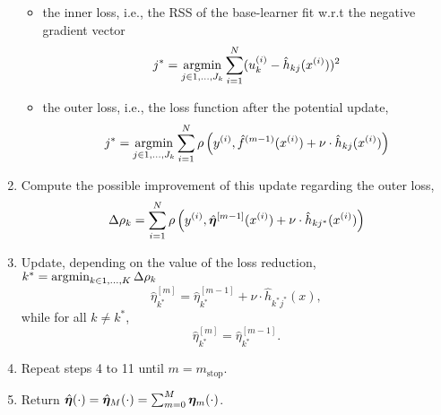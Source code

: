 \begin{algorithm}
\begin{enumerate}
        \begin{itemize}
            \item the inner loss, i.e., the RSS of the base-learner fit w.r.t the negative gradient vector
                \begin{equation*}
                    j^*=\operatorname*{argmin}_{j\in 1,\ldots,J_k}\sum_{i=1}^N(u_k^{(i)}-\hat{h}_{kj}(x^{(i)}))^2
                \end{equation*}
            \item the outer loss, i.e., the loss function after the potential update,
                \begin{equation*}
                    j^*=\operatorname*{argmin}_{j\in 1,\ldots,J_k}\sum_{i=1}^N\rho\left(y^{(i)}, \hat{f}^{(m-1)}(x^{(i)}) + \nu \cdot \hat{h}_{kj}(x^{(i)}) \right)
                \end{equation*}
        \end{itemize}
    \item Compute the possible improvement of this update regarding the outer loss,
        \begin{equation*}
            \Delta\rho_k=\sum_{i=1}^N\rho\left(y^{(i)}, \hat{\boldsymbol{\eta}}^{[m-1]}(x^{(i)}) + \nu \cdot \hat{h}_{kj^*}(x^{(i)}) \right)
        \end{equation*}
    \item Update, depending on the value of the loss reduction, $k^*=\operatorname*{argmin}_{k\in1,\ldots,K}\Delta\rho_k$
        \begin{equation*}
            \hat{\eta}^{[m]}_{k^*}=\hat{\eta}^{[m-1]}_{k^*}+\nu\cdot\hat{h}_{k^*j^*}(x),
        \end{equation*}
        while for all $k\neq k^*$,
        \begin{equation*}
            \hat{\eta}^{[m]}_{k^*}=\hat{\eta}^{[m-1]}_{k^*}.
        \end{equation*}
    \item Repeat steps 4 to 11 until $m=m_{\text{stop}}$.
    \item Return $\hat{\boldsymbol{\eta}}(\cdot)=\hat{\boldsymbol{\eta}}_M(\cdot)=\sum_{m=0}^M\boldsymbol{\eta}_m(\cdot)$.
\end{enumerate}
\end{algorithm}


